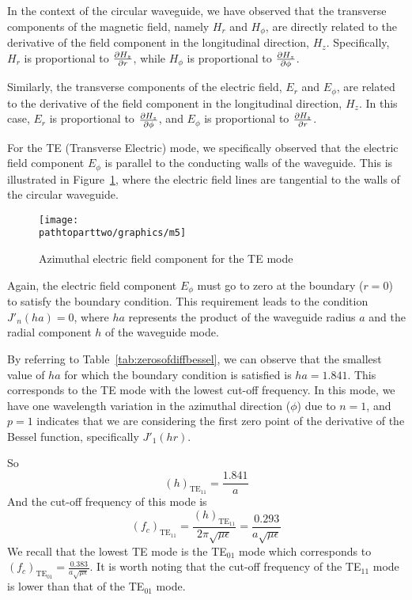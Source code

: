 In the context of the circular waveguide, we have observed that the transverse components of the magnetic field, namely $H_r$ and $H_\phi$, are directly related to the derivative of the field component in the longitudinal direction, $H_z$. Specifically, $H_r$ is proportional to $\partialderivative{H_z}{r}$, while $H_\phi$ is proportional to $\partialderivative{H_z}{\phi}$.

Similarly, the transverse components of the electric field, $E_r$ and $E_\phi$, are related to the derivative of the field component in the longitudinal direction, $H_z$. In this case, $E_r$ is proportional to $\partialderivative{H_z}{\phi}$, and $E_\phi$ is proportional to $\partialderivative{H_z}{r}$.

For the TE (Transverse Electric) mode, we specifically observed that the electric field component $E_\phi$ is parallel to the conducting walls of the waveguide. This is illustrated in Figure~\ref{fig:m5}, where the electric field lines are tangential to the walls of the circular waveguide.
\begin{figure}[h]
\centering
\texttt{[image: \\pathtoparttwo/graphics/m5]}
\caption{Azimuthal electric field component for the TE mode}
\label{fig:m5}
\end{figure}

Again, the electric field component $E_\phi$ must go to zero at the boundary ($r=0$) to satisfy the boundary condition. This requirement leads to the condition $J'_n(ha) = 0$, where $ha$ represents the product of the waveguide radius $a$ and the radial component $h$ of the waveguide mode.

By referring to Table~\ref{tab:zerosofdiffbessel}, we can observe that the smallest value of $ha$ for which the boundary condition is satisfied is $ha = 1.841$. This corresponds to the TE mode with the lowest cut-off frequency. In this mode, we have one wavelength variation in the azimuthal direction ($\phi$) due to $n=1$, and $p=1$ indicates that we are considering the first zero point of the derivative of the Bessel function, specifically $J'_1(hr)$.

So
$$
(h)_{\text{TE}_{11}} = \frac{1.841}{a}
$$
And the cut-off frequency of this mode is 
$$
(f_c)_{\text{TE}_{11}} = \frac{(h)_{\text{TE}_{11}}}{2\pi\sqrt{\mu\epsilon}} = \frac{0.293}{a\sqrt{\mu\epsilon}}
$$
We recall that the lowest TE mode is the TE$_{01}$ mode which corresponds to $(f_c)_{\text{TE}_{01}} = \frac{0.383}{a\sqrt{\mu\epsilon}}$. It is worth noting that the cut-off frequency of the TE$_{11}$ mode is lower than that of the TE$_{01}$ mode.

